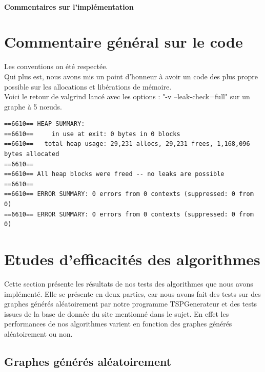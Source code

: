 \documentclass[10pt,a4paper]{report}
\begin{document}
		\paragraph{Commentaires sur l'implémentation\\}

\newpage		
\section{Commentaire général sur le code}

Les conventions on été respectée. \\
Qui plus est, nous avons mis un point d'honneur à avoir un code des plus propre possible sur les allocations et libérations de mémoire. \\

Voici le retour de valgrind lancé avec les options : "-v --leak-check=full" sur un graphe à 5 nœuds. \\
\begin{verbatim}
==6610== HEAP SUMMARY:
==6610==     in use at exit: 0 bytes in 0 blocks
==6610==   total heap usage: 29,231 allocs, 29,231 frees, 1,168,096 bytes allocated
==6610== 
==6610== All heap blocks were freed -- no leaks are possible
==6610== 
==6610== ERROR SUMMARY: 0 errors from 0 contexts (suppressed: 0 from 0)
==6610== ERROR SUMMARY: 0 errors from 0 contexts (suppressed: 0 from 0)
\end{verbatim}



\newpage
\section{Etudes d'efficacités des algorithmes}
	\begin{flushleft}
	Cette section présente les résultats de nos tests des algorithmes que nous avons implémenté. Elle se présente en deux parties, car nous avons fait des tests sur des graphes générés aléatoirement par notre programme TSPGenerateur et des tests issues de la base de donnée du site mentionné dans le sujet. En effet les performances de nos algorithmes varient en fonction des graphes générés aléatoirement ou non.
	\end{flushleft}
	\subsection{Graphes générés aléatoirement}
\end{document}
